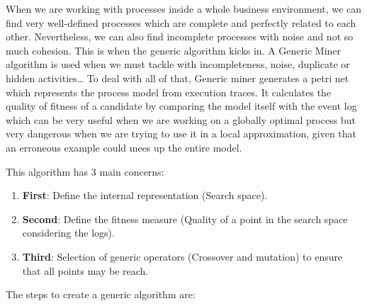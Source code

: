 \documentclass[conference]{IEEEtran}
\begin{document}
When we are working with processes inside a whole business environment, we can find very well-defined processes which are complete and perfectly related to each other. Nevertheless, we can also find incomplete processes with noise and not so much cohesion. This is when the generic algorithm kicks in.
A Generic Miner algorithm is used when we must tackle with incompleteness, noise, duplicate or hidden activities…
To deal with all of that, Generic miner generates a petri net which represents the process model from execution traces. It calculates the quality of fitness of a candidate by comparing the model itself with the event log which can be very useful when we are working on a globally optimal process but very dangerous when we are trying to use it in a local approximation, given that an erroneous example could mees up the entire model.

This algorithm has 3 main concerns:

\begin{enumerate}
    \item \textbf{First}: Define the internal representation (Search space).
    \item \textbf{Second}: Define the fitness measure (Quality of a point in the search space considering the logs).
    \item \textbf{Third}: Selection of generic operators (Crossover and mutation) to ensure that all points may be reach.
\end{enumerate}

The steps to create a generic algorithm are:
\end{document}
